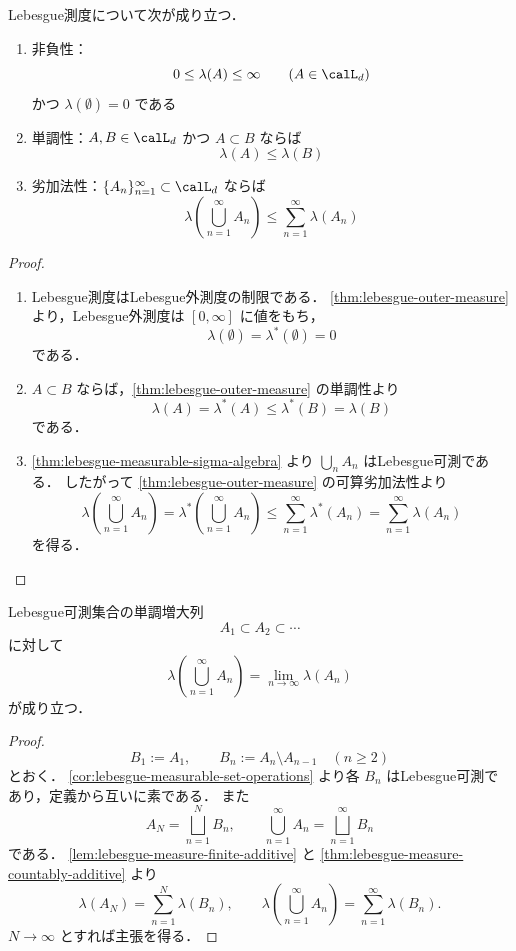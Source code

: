 \begin{theorem}[基本性質]
\label{thm:lebesgue-measure-basic}
Lebesgue測度について次が成り立つ．
\begin{enumerate}
    \item 非負性：
    \[
    0\le \lambda(A)\le\infty
    \qquad(A\in\calL_d)
    \]
    かつ $\lambda(\emptyset)=0$ である
    \item 単調性：$A,B\in\calL_d$ かつ $A\subset B$ ならば
    \[
    \lambda(A)\le \lambda(B)
    \]
    \item 劣加法性：$\{A_n\}_{n=1}^{\infty}\subset\calL_d$ ならば
    \[
    \lambda\left(\bigcup_{n=1}^{\infty}A_n\right)
    \le
    \sum_{n=1}^{\infty}\lambda(A_n)
    \]
\end{enumerate}
\end{theorem}
\begin{proof}
\begin{enumerate}
    \item Lebesgue測度はLebesgue外測度の制限である．
    \cref{thm:lebesgue-outer-measure} より，Lebesgue外測度は $[0,\infty]$ に値をもち，
    \[
    \lambda(\emptyset)=\lambda^*(\emptyset)=0
    \]
    である．

    \item $A\subset B$ ならば，\cref{thm:lebesgue-outer-measure} の単調性より
    \[
    \lambda(A)=\lambda^*(A)\le \lambda^*(B)=\lambda(B)
    \]
    である．

    \item \cref{thm:lebesgue-measurable-sigma-algebra} より $\bigcup_n A_n$ はLebesgue可測である．
    したがって \cref{thm:lebesgue-outer-measure} の可算劣加法性より
    \[
    \lambda\left(\bigcup_{n=1}^{\infty}A_n\right)
    =
    \lambda^*\left(\bigcup_{n=1}^{\infty}A_n\right)
    \le
    \sum_{n=1}^{\infty}\lambda^*(A_n)
    =
    \sum_{n=1}^{\infty}\lambda(A_n)
    \]
    を得る．
\end{enumerate}
\end{proof}

\begin{theorem}[下からの連続性]
\label{thm:lebesgue-measure-continuity-from-below}
Lebesgue可測集合の単調増大列
\[
A_1\subset A_2\subset\cdots
\]
に対して
\[
\lambda\left(\bigcup_{n=1}^{\infty}A_n\right)
=
\lim_{n\to\infty}\lambda(A_n)
\]
が成り立つ．
\end{theorem}
\begin{proof}
\[
B_1:=A_1,\qquad
B_n:=A_n\setminus A_{n-1}\quad(n\ge2)
\]
とおく．
\cref{cor:lebesgue-measurable-set-operations} より各 $B_n$ はLebesgue可測であり，定義から互いに素である．
また
\[
A_N=\bigsqcup_{n=1}^{N}B_n,
\qquad
\bigcup_{n=1}^{\infty}A_n=\bigsqcup_{n=1}^{\infty}B_n
\]
である．
\cref{lem:lebesgue-measure-finite-additive} と \cref{thm:lebesgue-measure-countably-additive} より
\[
\lambda(A_N)=\sum_{n=1}^{N}\lambda(B_n),
\qquad
\lambda\left(\bigcup_{n=1}^{\infty}A_n\right)
=
\sum_{n=1}^{\infty}\lambda(B_n).
\]
$N\to\infty$ とすれば主張を得る．
\end{proof}

